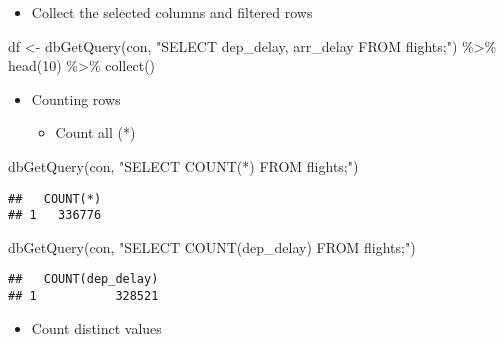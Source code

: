 \documentclass[
]{book}
\newenvironment{Shaded}{\begin{snugshade}}{\end{snugshade}}
\newcommand{\DecValTok}[1]{\textcolor[rgb]{0.00,0.00,0.81}{#1}}
\newcommand{\FunctionTok}[1]{\textcolor[rgb]{0.00,0.00,0.00}{#1}}
\newcommand{\NormalTok}[1]{#1}
\newcommand{\OtherTok}[1]{\textcolor[rgb]{0.56,0.35,0.01}{#1}}
\newcommand{\SpecialCharTok}[1]{\textcolor[rgb]{0.00,0.00,0.00}{#1}}
\newcommand{\StringTok}[1]{\textcolor[rgb]{0.31,0.60,0.02}{#1}}
\providecommand{\tightlist}{%
  \setlength{\itemsep}{0pt}\setlength{\parskip}{0pt}}
\begin{document}
\begin{itemize}
\tightlist
\item
  Collect the selected columns and filtered rows
\end{itemize}

\begin{Shaded}
\begin{Highlighting}[]
\NormalTok{df }\OtherTok{\textless{}{-}} \FunctionTok{dbGetQuery}\NormalTok{(con, }
  \StringTok{"SELECT dep\_delay, arr\_delay FROM flights;"}\NormalTok{) }\SpecialCharTok{\%\textgreater{}\%}
  \FunctionTok{head}\NormalTok{(}\DecValTok{10}\NormalTok{) }\SpecialCharTok{\%\textgreater{}\%}
  \FunctionTok{collect}\NormalTok{()}
\end{Highlighting}
\end{Shaded}

\begin{itemize}
\item
  Counting rows

  \begin{itemize}
  \tightlist
  \item
    Count all (*)
  \end{itemize}
\end{itemize}

\begin{Shaded}
\begin{Highlighting}[]
\FunctionTok{dbGetQuery}\NormalTok{(con, }
          \StringTok{"SELECT COUNT(*) }
\StringTok{           FROM flights;"}\NormalTok{) }
\end{Highlighting}
\end{Shaded}

\begin{verbatim}
##   COUNT(*)
## 1   336776
\end{verbatim}

\begin{Shaded}
\begin{Highlighting}[]
\FunctionTok{dbGetQuery}\NormalTok{(con, }
           \StringTok{"SELECT COUNT(dep\_delay)}
\StringTok{           FROM flights;"}\NormalTok{)}
\end{Highlighting}
\end{Shaded}

\begin{verbatim}
##   COUNT(dep_delay)
## 1           328521
\end{verbatim}

\begin{itemize}
\tightlist
\item
  Count distinct values
\end{itemize}
\end{document}
